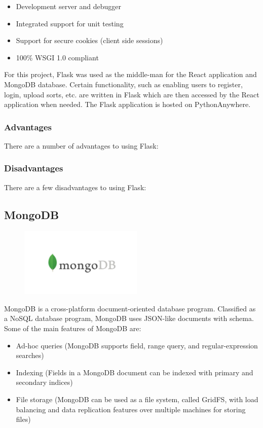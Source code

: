 \begin{itemize}
    \item Development server and debugger
    \item Integrated support for unit testing
    \item Support for secure cookies (client side sessions)
    \item 100\% WSGI 1.0 compliant
\end{itemize}

For this project, Flask was used as the middle-man for the React application and MongoDB database. Certain functionality, such as enabling users to register, login, upload sorts, etc. are written in Flask which are then accessed by the React application when needed. The Flask application is hosted on PythonAnywhere.

\subsubsection{Advantages}
There are a number of advantages to using Flask:

\subsubsection{Disadvantages}
There are a few disadvantages to using Flask:


\subsection{MongoDB}
\par
\medskip
\begin{center}
    \includegraphics[width=8cm,height=3.3cm,keepaspectratio]{images/mongodb}
\end{center}
MongoDB is a cross-platform document-oriented database program. Classified as a NoSQL database program, MongoDB uses JSON-like documents with schema. Some of the main features of MongoDB are:

\begin{itemize}
    \item Ad-hoc queries (MongoDB supports field, range query, and regular-expression searches)
    \item Indexing (Fields in a MongoDB document can be indexed with primary and secondary indices)
    \item File storage (MongoDB can be used as a file system, called GridFS, with load balancing and data replication features over multiple machines for storing files)  
\end{itemize}

